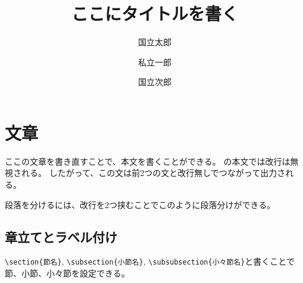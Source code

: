 \documentclass[uplatex, a4paper,twocolumn, 14pt]{jsarticle}
\begin{document}
\title{ここにタイトルを書く}
\author[1]{国立太郎}
\author[2]{私立一郎}
\author[1]{国立次郎}
\date{} %





\section{文章}

ここの文章を書き直すことで、本文を書くことができる。
の本文では改行は無視される。
したがって、この文は前2つの文と改行無しでつながって出力される。

段落を分けるには、改行を2つ挟むことでこのように段落分けができる。

\subsection{章立てとラベル付け \label{sec:aaa}}

\verb|\section{節名}|, \verb|\subsection{小節名}|, \verb|\subsubsection{小々節名}|と書くことで節、小節、小々節を設定できる。
\end{document}
